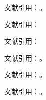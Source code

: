 \documentclass{ctexart}
\begin{document}
 文献引用：\cite{张杰2020}。

 文献引用：\cite{杨继生邹建文2020,朱恒鹏岳阳2020}

 文献引用：\cite{Alkire2017,曹廷求张光利2020,田国强李双建2020,张杰2020}

 文献引用：\cite{Alkire2017}。

 文献引用：\cite{Foster2009,Berenger2019}。

 文献引用：\cite{Zhou2021,Suppa2018,Alkire2011}。



 
\end{document}
